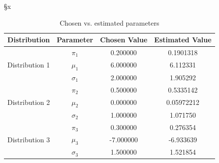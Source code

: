 §x\documentclass[]{article}
\begin{document}
\begin{table}[H]
	\centering
	\renewcommand{\arraystretch}{1.2}
	\begin{tabular}{|c|c|c|c|}
		\hline
		Distribution & Parameter & Chosen Value & Estimated Value \\
		\hline
		\multirow{3}{*}{Distribution 1} & $\pi_1$ & 0.200000 & 0.1901318 \\
		& $\mu_1$ & 6.000000 & 6.112331 \\
		& $\sigma_1$ & 2.000000 & 1.905292 \\
		\hline
		\multirow{3}{*}{Distribution 2} & $\pi_2$ & 0.500000 & 0.5335142 \\
		& $\mu_2$ & 0.000000 & 0.05972212 \\
		& $\sigma_2$ & 1.000000 & 1.071750 \\
		\hline
		\multirow{3}{*}{Distribution 3} & $\pi_3$ & 0.300000 & 0.276354 \\
		& $\mu_3$ & -7.000000 & -6.933639 \\
		& $\sigma_3$ & 1.500000 & 1.521854 \\
		\hline
	\end{tabular}
	\caption{Chosen vs. estimated parameters}
	\label{tab:gmm_chosen_vs_estimated_full}
\end{table}





\end{document}
